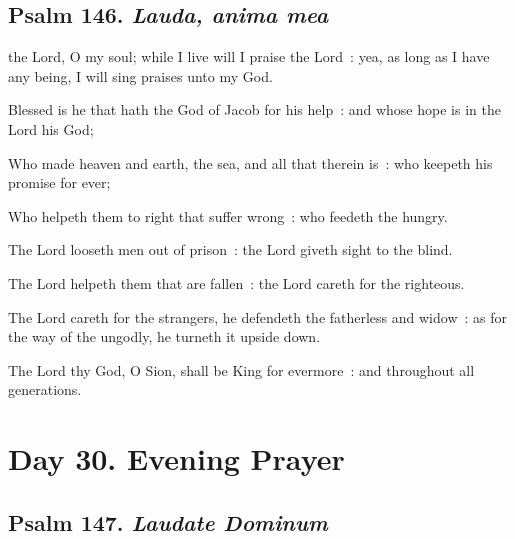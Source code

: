 \subsection{Psalm 146. \textit{Lauda, anima mea}}


 the Lord, O my soul; while I live will I praise the Lord~: yea, as long as I have any being, I will sing praises unto my God.\par
{}
Blessed is he that hath the God of Jacob for his help~: and whose hope is in the Lord his God;\par
{}Who made heaven and earth, the sea, and all that therein is~: who keepeth his promise for ever;\par
{}Who helpeth them to right that suffer wrong~: who feedeth the hungry.\par
{}The Lord looseth men out of prison~: the Lord giveth sight to the blind.\par
{}The Lord helpeth them that are fallen~: the Lord careth for the righteous.\par
{}The Lord careth for the strangers, he defendeth the fatherless and widow~: as for the way of the ungodly, he turneth it upside down.\par
{}The Lord thy God, O Sion, shall be King for evermore~: and throughout all generations.\par

\section*{Day 30. Evening Prayer}

\subsection{Psalm 147. \textit{Laudate Dominum}}


